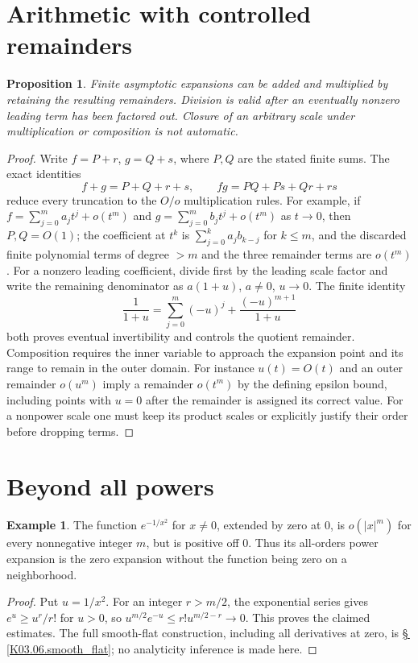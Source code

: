 \documentclass[11pt,oneside,a4paper]{book}
\newtheorem{proposition}[theorem]{Proposition}
\theoremstyle{definition}
\newtheorem{example}[theorem]{Example}
\theoremstyle{remark}
\newcommand{\KEntry}[2]{\Needspace{7\baselineskip}\section{#2}\label{#1}{\small\sffamily\color{black!60}\detokenize{#1}}\par}
\newcommand{\KRef}[1]{\hyperref[#1]{\S\,\ref*{#1}}}
\begin{document}
\KEntry{K03.17.operations}{Arithmetic with controlled remainders}
\begin{proposition}
Finite asymptotic expansions can be added and multiplied by retaining the
resulting remainders. Division is valid after an eventually nonzero leading
term has been factored out. Closure of an arbitrary scale under multiplication
or composition is not automatic.
\end{proposition}
\begin{proof}
Write $f=P+r$, $g=Q+s$, where $P,Q$ are the stated finite sums. The exact
identities
\[
 f+g=P+Q+r+s,\qquad fg=PQ+Ps+Qr+rs
\]
reduce every truncation to the $O/o$ multiplication rules. For example, if
$f=\sum_{j=0}^m a_jt^j+o(t^m)$ and
$g=\sum_{j=0}^m b_jt^j+o(t^m)$ as $t\to0$, then $P,Q=O(1)$;
the coefficient at $t^k$ is $\sum_{j=0}^ka_jb_{k-j}$ for $k\leq m$, and
the discarded finite polynomial terms of degree $>m$ and the three remainder
terms are $o(t^m)$. For a nonzero leading coefficient, divide first by the
leading scale factor and write the remaining denominator as $a(1+u)$,
$a\ne0$, $u\to0$. The finite identity
\[
 \frac1{1+u}=\sum_{j=0}^{m}(-u)^j+
 \frac{(-u)^{m+1}}{1+u}
\]
both proves eventual invertibility and controls the quotient remainder.
Composition requires the inner variable to approach the expansion point and
its range to remain in the outer domain. For instance $u(t)=O(t)$ and an outer
remainder $o(u^m)$ imply a remainder $o(t^m)$ by the defining epsilon bound,
including points with $u=0$ after the remainder is assigned its correct value.
For a nonpower scale one must keep its product scales or explicitly justify
their order before dropping terms.
\end{proof}

\KEntry{K03.17.flat_remainder}{Beyond all powers}
\begin{example}
The function $e^{-1/x^2}$ for $x\ne0$, extended by zero at $0$, is
$o(|x|^m)$ for every nonnegative integer $m$, but is positive off $0$.
Thus its all-orders power expansion is the zero expansion without the function
being zero on a neighborhood.
\end{example}
\begin{proof}
Put $u=1/x^2$. For an integer $r>m/2$, the exponential series gives
$e^u\geq u^r/r!$ for $u>0$, so
$u^{m/2}e^{-u}\leq r!u^{m/2-r}\to0$. This proves the claimed estimates.
The full smooth-flat construction, including all derivatives at zero, is
\KRef{K03.06.smooth_flat}; no analyticity inference is made here.
\end{proof}
\end{document}
